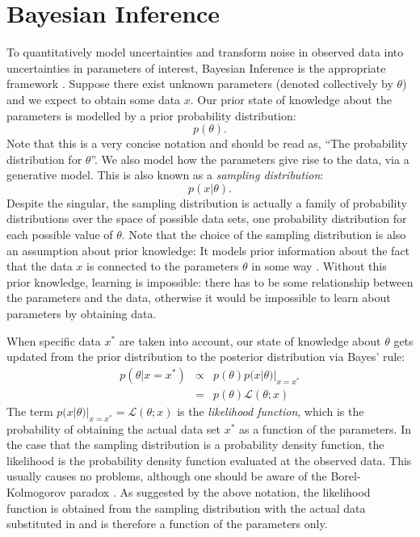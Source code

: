 \documentclass[12pt, preprint]{aastex}
\begin{document}
\section{Bayesian Inference}\label{sec:bayes}
To quantitatively model uncertainties and transform noise in observed data
into uncertainties in parameters of interest, Bayesian Inference is the appropriate
framework \citep{cox, jaynes, caticha, mackay}. Suppose there exist unknown parameters
(denoted
collectively by $\theta$) and we expect to obtain some data $x$. Our prior
state of knowledge about the parameters is modelled by a prior
probability distribution:
\begin{equation}
p(\theta).
\end{equation}
Note that this is a very concise notation \citep{hogg} and should be read
as, ``The probability distribution for $\theta$''.
We also model how the parameters give rise to the data, via a generative model.
This is also known as a {\it sampling distribution}:
\begin{equation}
p(x|\theta).
\end{equation}
Despite the singular, the sampling distribution is actually a family of
probability distributions over the space of possible data sets, one probability
distribution for each possible value
of $\theta$. Note that the choice of
the sampling distribution is also an assumption about prior knowledge:
It models prior information about the fact that the data $x$ is connected to
the parameters $\theta$ in some way \citep{caticha}. Without this prior
knowledge, learning is impossible: there has to be some relationship between
the parameters and the data, otherwise it would be impossible to learn about
parameters by obtaining data.

When specific data $x^*$ are taken into account, our state of knowledge about $\theta$
gets updated from the prior distribution to the posterior distribution
via Bayes' rule:
\begin{eqnarray}
p(\theta|x=x^*) &\propto& p(\theta)p(x|\theta)|_{x=x^*} \\
&=& p(\theta)\mathcal{L}(\theta; x)
\end{eqnarray}
The term $p(x|\theta)|_{x=x^*} = \mathcal{L}(\theta; x)$
is the {\it likelihood function}, which is the
probability of obtaining the actual data set $x^*$ as a function of the
parameters. In the case that the sampling distribution is a probability
density function, the likelihood is the probability density function evaluated at the observed
data. This usually causes no problems, although one should be aware of the
Borel-Kolmogorov paradox \citep{jaynes}.
As suggested by the above notation, the likelihood function is obtained from the
sampling distribution with the actual data substituted in and is therefore
a function of the parameters only.
\end{document}
